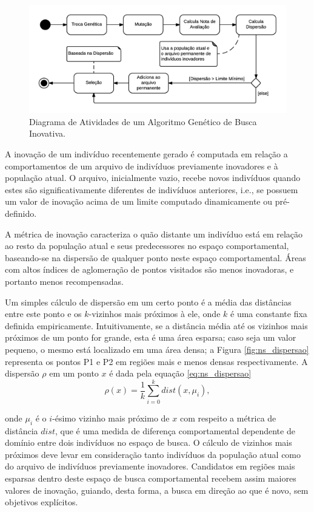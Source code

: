 \begin{figure}[htb]
	\begin{center}
		\includegraphics[width=1.0\textwidth]{Imagens/ns_diag_ns.png}
		\caption{Diagrama de Atividades de um Algoritmo Genético de Busca Inovativa.}
		\label{fig:ns_diag_ns}
	\end{center}
\end{figure}

A inovação de um indivíduo recentemente gerado é computada em relação a comportamentos de um arquivo de indivíduos previamente inovadores e à população atual. O arquivo, inicialmente vazio, recebe novos indivíduos quando estes são significativamente diferentes de indivíduos anteriores, i.e., se possuem um valor de inovação acima de um limite computado dinamicamente ou pré-definido.

A métrica de inovação caracteriza o quão distante um indivíduo está em relação ao resto da população atual e seus predecessores no espaço comportamental, baseando-se na dispersão de qualquer ponto neste espaço comportamental. Áreas com altos índices de aglomeração de pontos visitados são menos inovadoras, e portanto menos recompensadas.

Um simples cálculo de dispersão em um certo ponto é a média das distâncias entre este ponto e os $k$-vizinhos mais próximos à ele, onde $k$ é uma constante fixa definida empiricamente. Intuitivamente, se a distância média até os vizinhos mais próximos de um ponto for grande, esta é uma área esparsa; caso seja um valor pequeno, o mesmo está localizado em uma área densa; a Figura \ref{fig:ns_dispersao} representa os pontos P1 e P2 em regiões mais e menos densas respectivamente. A dispersão $\rho$ em um ponto $x$ é dada pela equação \ref{eq:ns_dispersao}
\begin{equation}
    \rho(x) = \frac{1}{k}\sum_{i=0}^kdist(x, \mu_i),
    \label{eq:ns_dispersao}
\end{equation}

\noindent onde $\mu_i$ é o $i$-ésimo vizinho mais próximo de $x$ com respeito a métrica de distância $dist$, que é uma medida de diferença comportamental dependente de domínio entre dois indivíduos no espaço de busca. O cálculo de vizinhos mais próximos deve levar em consideração tanto indivíduos da população atual como do arquivo de indivíduos previamente inovadores. Candidatos em regiões mais esparsas dentro deste espaço de busca comportamental recebem assim maiores valores de inovação, guiando, desta forma, a busca em direção ao que é novo, sem objetivos explícitos.


